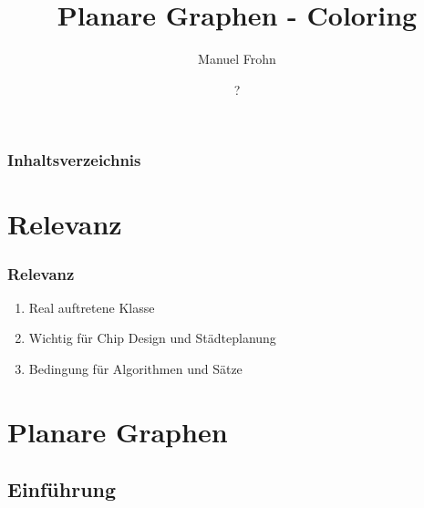 \documentclass{beamer}
\author{Manuel Frohn}
\title{Planare Graphen - Coloring}
\institute{RWTH Aachen University, Aachen, Germany}
\date{?}
\begin{document}
    \begin{frame}
        \maketitle
    \end{frame}

    \begin{frame}
        \frametitle{Inhaltsverzeichnis}
        \tableofcontents
    \end{frame}

    \section{Relevanz}

    \begin{frame}
        \frametitle{Relevanz}
        \begin{enumerate}
            \item Real auftretene Klasse
            \item Wichtig für Chip Design und Städteplanung
            \item Bedingung für Algorithmen und Sätze
        \end{enumerate}
    \end{frame}

    \section{Planare Graphen}
    \subsection{Einführung}
\end{document}
